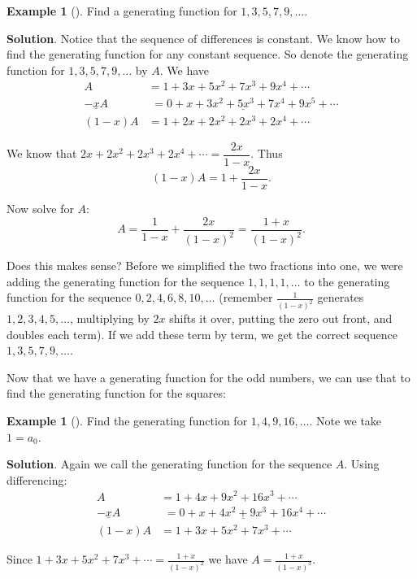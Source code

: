 \documentclass[10pt,]{book}
\theoremstyle{plain}
\theoremstyle{definition}
\theoremstyle{definition}
\newtheorem{example}[theorem]{Example}
\theoremstyle{definition}
\theoremstyle{definition}
\numberwithin{equation}{chapter}
\def\d{\displaystyle}
\newcommand{\amp}{&}
\begin{document}
\begin{example}[]\label{example-23}
\hypertarget{p-979}{}%
Find a generating function for \(1, 3, 5, 7, 9,\ldots\).%
\par\smallskip%
\noindent\textbf{Solution}.\hypertarget{solution-95}{}\quad%
\hypertarget{p-980}{}%
Notice that the sequence of differences is constant. We know how to find the generating function for any constant sequence. So denote the generating function for \(1, 3, 5, 7, 9, \ldots\) by \(A\). We have%
\begin{align*}
A \amp  = 1 + 3x + 5x^2 + 7x^3 + 9x^4 + \cdots\\
\underline{-xA} \amp  \underline{\,\,= 0 + x + 3x^2 +  5x^3 + 7x^4 + 9x^5 + \cdots}\\
(1-x)A \amp  = 1 + 2x + 2x^2 + 2x^3 + 2x^4 + \cdots
\end{align*}
%
\par
\hypertarget{p-981}{}%
We know that \(2x + 2x^2 + 2x^3 + 2x^4 + \cdots = \dfrac{2x}{1-x}\). Thus%
\begin{equation*}
(1-x)A = 1 + \frac{2x}{1-x}.
\end{equation*}
%
\par
\hypertarget{p-982}{}%
Now solve for \(A\):%
\begin{equation*}
A = \frac{1}{1-x} + \frac{2x}{(1-x)^2} = \frac{1+x}{(1-x)^2}.
\end{equation*}
%
\par
\hypertarget{p-983}{}%
Does this makes sense? Before we simplified the two fractions into one, we were adding the generating function for the sequence \(1,1,1,1,\ldots\) to the generating function for the sequence \(0, 2, 4, 6, 8, 10, \ldots\) (remember \(\frac{1}{(1-x)^2}\) generates \(1,2,3,4,5, \ldots\), multiplying by \(2x\) shifts it over, putting the zero out front, and doubles each term). If we add these term by term, we get the correct sequence \(1,3,5,7, 9, \ldots\).%
\end{example}
\hypertarget{p-984}{}%
Now that we have a generating function for the odd numbers, we can use that to find the generating function for the squares:%
\begin{example}[]\label{example-24}
\hypertarget{p-985}{}%
Find the generating function for \(1, 4, 9, 16, \ldots\). Note we take \(1 = a_0\).%
\par\smallskip%
\noindent\textbf{Solution}.\hypertarget{solution-96}{}\quad%
\hypertarget{p-986}{}%
Again we call the generating function for the sequence \(A\). Using differencing:%
\begin{align*}
A \amp  = 1 + 4x + 9x^2 + 16x^3 + \cdots\\
\underline{- xA} \amp  \underline{\,\, = 0 + x + 4x^2 + 9x^3 + 16x^4 + \cdots}\\
(1-x)A \amp  = 1 + 3x + 5x^2 + 7x^3 + \cdots
\end{align*}
%
\par
\hypertarget{p-987}{}%
Since \(1 + 3x + 5x^2 + 7x^3 + \cdots = \d\frac{1+x}{(1-x)^2}\) we have \(A = \d\frac{1+x}{(1-x)^3}\).%
\end{example}
\end{document}

